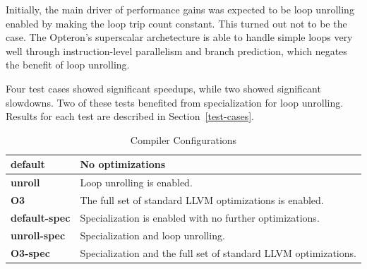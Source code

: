 \documentclass{acm_proc_article-sp}
\begin{document}
Initially, the main driver of performance gains was expected to be loop
unrolling enabled by making the loop trip count constant. This turned out not
to be the case. The Opteron's superscalar archetecture is able to handle simple
loops very well through instruction-level parallelism and branch prediction,
which negates the benefit of loop unrolling\cite{Jouppi:1989:ILP}.

Four test cases showed significant speedups, while two showed significant
slowdowns. Two of these tests benefited from specialization for loop unrolling.
Results for each test are described in Section~\ref{test-cases}.

\begin{table}
\renewcommand{\arraystretch}{1.2}
\begin{tabular}{ l | p{2in} }
    {\bf default} & No optimizations \\
    \hline
    {\bf unroll} & Loop unrolling is enabled. \\
    \hline
    {\bf O3} & The full set of standard LLVM optimizations is enabled. \\
    \hline
    {\bf default-spec} & Specialization is enabled with no further optimizations. \\
    \hline
    {\bf unroll-spec} & Specialization and loop unrolling. \\
    \hline
    {\bf O3-spec} & Specialization and the full set of standard LLVM optimizations. \\
\end{tabular}
\caption{\label{test-configs} Compiler Configurations}
\end{table}
\end{document}

